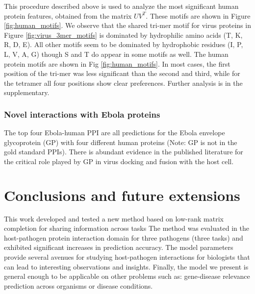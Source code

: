 \documentclass[runningheads,a4paper]{llncs}
\begin{document}
This procedure described above is used to analyze the most significant human protein features, obtained from
the matrix $U V^T$. These motifs are shown in Figure \ref{fig:human_motifs}. We observe that the shared tri-mer motif for virus proteins in Figure \ref{fig:virus_3mer_motifs} is dominated by 
hydrophilic amino acids (T, K, R, D, E). All other motifs seem to be dominated by hydrophobic residues (I, P, L, V, A, G)
though S and T do appear in some motifs as well.
The human protein motifs are shown in Fig \ref{fig:human_motifs}. In most cases, the first position of the tri-mer was less significant than the second and third, while for the tetramer all four positions show clear preferences.
Further analysis is in the supplementary.

\subsubsection{Novel interactions with Ebola proteins}
The top four Ebola-human PPI are all predictions for the Ebola envelope glycoprotein (GP) with four different human proteins (Note: GP is not in the gold standard PPIs). There is abundant evidence in the published literature \cite{nanbo2010} for the critical role played by GP in virus docking and fusion with the host cell.

\section{Conclusions and future extensions}
This work developed and tested a new method based on low-rank matrix completion for sharing information across tasks
The method was evaluated in the host-pathogen protein interaction domain for three pathogens (three tasks) and exhibited significant increases in prediction accuracy. The model parameters provide several avenues for
studying host-pathogen interactions for biologists that can lead to interesting observations and insights. Finally, the model we present is general enough to be applicable on other problems such as: gene-disease relevance prediction across organisms or disease conditions. 

\scriptsize{

%
%
}
\end{document}
